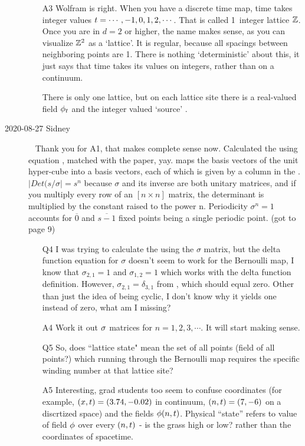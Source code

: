 \begin{description}
\begin{itemize}
  \item[A3]
Wolfram is right. When you have a discrete time map, time takes integer
values $t=\cdots,-1,0,1,2,\cdots$. That is called 1\dmn\ integer lattice
$\mathbb{Z}$. Once you are in $d=2$ or higher, the name makes sense, as
you can visualize $\mathbb{Z}^2$ as a `lattice'. It is regular, because all spacings
between neighboring points are 1. There is nothing `deterministic' about
this, it just says that time takes its values on integers, rather than on a continuum.

There is only one lattice, but on each lattice site there is a
real-valued field $\phi_{t}$ and the integer valued `source' \Ssym{\zeit}.
\end{itemize}

\item[2020-08-27 Sidney]~
Thank you for A1, that makes complete sense now. Calculated the {\jacobianOrb} using equation , matched with the paper, yay.
{\JacobianOrb} maps the basis vectors of the unit hyper-cube into a
{\fundPip} basis vectors, each of which is given by a
column in the {\jacobianOrb}. $|Det(s/\sigma|=s^n$ because $\sigma$ and
its inverse are both unitary matrices, and if you multiply every row of
an $[n\times{n}]$ matrix, the determinant is multiplied by the constant
raised to the power n. Periodicity $\sigma^n=1$ accounts for
$\overline{0}$ and $\overline{s-1}$ fixed points being a single periodic
point. (got to page 9)

\begin{itemize}
	\item[Q4]
I was trying to calculate the {\jacobianOrb} using the $\sigma$ matrix, but the delta function equation  for $\sigma$ doesn't seem to work for the Bernoulli map, I know that $\sigma_{2,1}=1$ and $\sigma_{1,2}=1$ which works with the delta function definition. However, $\sigma_{2,1}=\delta_{3,1}$ from , which should equal zero. Other than just the idea of being cyclic, I don't know why it yields one instead of zero, what am I missing?
  \item[A4]
Work it out $\mathbf{\sigma}$ matrices for $n=1,2,3,\cdots$. It will start making sense.
	\item[Q5]
So, does ``lattice state" mean the set of all points (field of all points?) which running through the Bernoulli map requires the specific winding number at that lattice site?
  \item[A5]
Interesting, grad students too seem to confuse coordinates (for example,
$(x,t)=(3.74,-0.02)$ in continuum, $(n,t)=(7,-6)$ on a discrtized space)
and the
fields $\phi(n,t)$. Physical ``state'' refers to value of field $\phi$
over every $(n,t)$ - is the grass high or low? rather than the coordinates
of spacetime.


\end{itemize}
\end{description}
